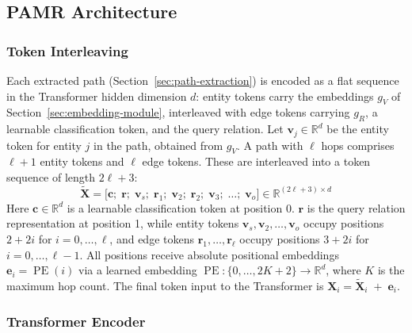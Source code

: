 \documentclass[runningheads]{llncs}
\begin{document}
\subsection{PAMR Architecture}
\label{sec:pamr-architecture}

\subsubsection{Token Interleaving}
\label{sec:token-interleaving}

Each extracted path (Section~\ref{sec:path-extraction}) is encoded as a
flat sequence in the Transformer hidden dimension $d$: entity tokens
carry the embeddings $g_V$ of Section~\ref{sec:embedding-module},
interleaved with edge tokens carrying $g_R$, a learnable classification
token, and the query relation. Let $\mathbf{v}_j \in \mathbb{R}^{d}$ be
the entity token for entity $j$ in the path, obtained from $g_V$.
A path with $\ell$ hops comprises $\ell+1$ entity tokens and $\ell$ edge tokens.
These are interleaved into a token sequence of length $2\ell + 3$:
\begin{equation}
  \tilde{\mathbf{X}} = \bigl[\mathbf{c};\; \mathbf{r};\;
    \mathbf{v}_{s};\; \mathbf{r}_{1};\; \mathbf{v}_{2};\; \mathbf{r}_{2};\;
  \mathbf{v}_{3};\; \ldots;\; \mathbf{v}_{o}\bigr]
  \in \mathbb{R}^{(2\ell+3) \times d}
  \label{eq:token-seq}
\end{equation}
Here $\mathbf{c} \in \mathbb{R}^{d}$ is a learnable classification token
at position 0.
$\mathbf{r}$ is the query relation representation at position 1, while entity tokens
$\mathbf{v}_{s}, \mathbf{v}_{2}, \ldots, \mathbf{v}_{o}$ occupy positions $2 + 2i$
for $i = 0, \ldots, \ell$, and edge tokens $\mathbf{r}_{1}, \ldots, \mathbf{r}_{\ell}$
occupy positions $3 + 2i$ for $i = 0, \ldots, \ell - 1$.
All positions receive absolute positional embeddings
$\mathbf{e}_i = \operatorname{PE}(i)$ via a learned embedding
$\operatorname{PE}: \{0, \ldots, 2K+2\} \to \mathbb{R}^{d}$,
where $K$ is the maximum hop count.
The final token input to the Transformer is $\mathbf{X}_i = \tilde{\mathbf{X}}_i \;+\; \mathbf{e}_i$.
\subsubsection{Transformer Encoder}

\label{sec:transformer-encoder}
\end{document}
